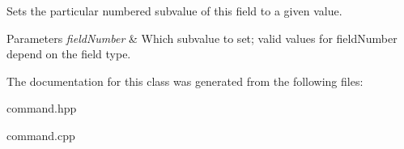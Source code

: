 Sets the particular numbered subvalue of this field to a given value. 


\begin{DoxyParams}{Parameters}
{\em field\+Number} & Which subvalue to set; valid values for field\+Number depend on the field type. \\
\hline
\end{DoxyParams}


The documentation for this class was generated from the following files\+:\begin{DoxyCompactItemize}
\item 
command.\+hpp\item 
command.\+cpp\end{DoxyCompactItemize}
